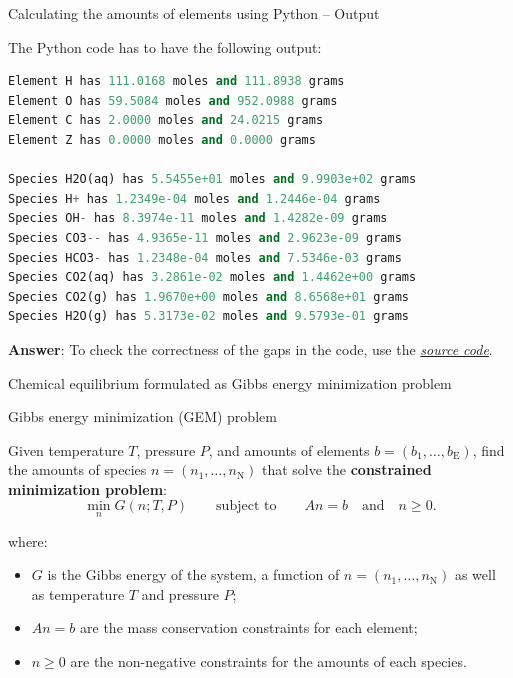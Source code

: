 \begin{frame}[fragile]{Calculating the amounts of elements using Python -- Output}

The Python code has to have the following output:

\begin{lstlisting}[language=Python, caption=Calculating the amounts of elements using Python -- Output]
Element H has 111.0168 moles and 111.8938 grams
Element O has 59.5084 moles and 952.0988 grams
Element C has 2.0000 moles and 24.0215 grams
Element Z has 0.0000 moles and 0.0000 grams

Species H2O(aq) has 5.5455e+01 moles and 9.9903e+02 grams
Species H+ has 1.2349e-04 moles and 1.2446e-04 grams
Species OH- has 8.3974e-11 moles and 1.4282e-09 grams
Species CO3-- has 4.9365e-11 moles and 2.9623e-09 grams
Species HCO3- has 1.2348e-04 moles and 7.5346e-03 grams
Species CO2(aq) has 3.2861e-02 moles and 1.4462e+00 grams
Species CO2(g) has 1.9670e+00 moles and 8.6568e+01 grams
Species H2O(g) has 5.3173e-02 moles and 9.5793e-01 grams
\end{lstlisting}

\textbf{Answer}: To check the correctness of the gaps in the code, use the  \href{https://polybox.ethz.ch/index.php/s/sVotdOJMkp740Lw}{\textcolor{indigo(dye)}{\it source code}}.

\end{frame}
%
%
\begin{frame}{Chemical equilibrium formulated as Gibbs energy minimization problem}
%
\begin{cbox}{Gibbs energy minimization (GEM) problem}

Given temperature $T$, pressure $P$, and amounts of elements ${b=(b_{1},\ldots,b_{\text{E}})}$,
find the amounts of species ${n=(n_{1},\ldots,n_{\text{N}})}$ that
solve the \textbf{constrained minimization problem}:
\[
\min_{n}G(n;T,P)\qquad\text{subject to}\qquad An=b\quad\text{and}\quad n\geq0.
\]

\end{cbox}where:

\begin{itemize}
\item $G$ is the Gibbs energy of the system, a function of $n=(n_{1},\ldots,n_{\text{N}})$
as well as temperature $T$ and pressure $P$;
\item $An=b$ are the mass conservation constraints for each element;
\item $n\geq0$ are the non-negative constraints for the amounts of each
species.
\end{itemize}
\end{frame}
